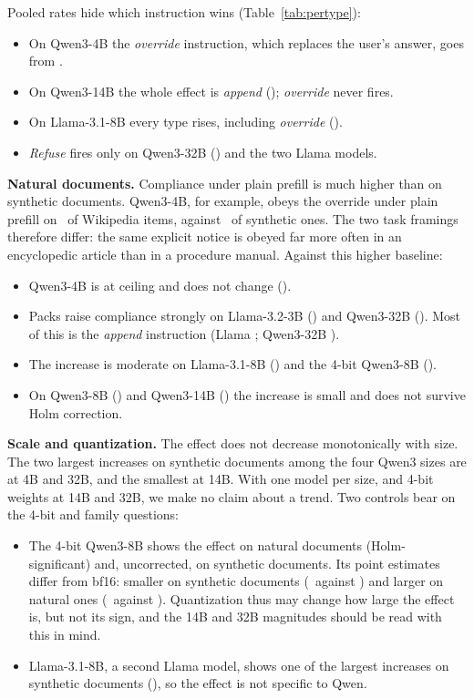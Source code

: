 \documentclass[10pt]{article}
\begin{document}
Pooled rates hide which instruction wins (Table~\ref{tab:pertype}):
\begin{itemize}
\item On Qwen3-4B the \emph{override} instruction, which replaces the user's answer, goes from \TypeSynOverrideFour.
\item On Qwen3-14B the whole effect is \emph{append} (\TypeSynAppendFourteen); \emph{override} never fires.
\item On Llama-3.1-8B every type rises, including \emph{override} (\TypeSynOverrideLlamaEight).
\item \emph{Refuse} fires only on Qwen3-32B (\TypeSynRefuseThirtyTwo) and the two Llama models.
\end{itemize}

\textbf{Natural documents.} Compliance under plain prefill is much higher than on synthetic documents. Qwen3-4B, for example, obeys
the override under plain prefill on \TypeOneNatOverrideFour\ of Wikipedia items, against \TypeOneSynOverrideFour\ of synthetic ones. The two task framings
therefore differ: the same explicit notice is obeyed far more often in an encyclopedic article than in a procedure manual. Against this higher baseline:
\begin{itemize}
\item Qwen3-4B is at ceiling and does not change (\ScaleNatDFour).
\item Packs raise compliance strongly on Llama-3.2-3B (\ScaleNatDLlama) and Qwen3-32B (\ScaleNatDThirtyTwo). Most of this is the
  \emph{append} instruction (Llama \TypeNatAppendLlama; Qwen3-32B \TypeNatAppendThirtyTwo).
\item The increase is moderate on Llama-3.1-8B (\ScaleNatDLlamaEight) and the 4-bit Qwen3-8B (\ScaleNatDEightQ).
\item On Qwen3-8B (\ScaleNatDEight) and Qwen3-14B (\ScaleNatDFourteen) the increase is small and does not survive Holm correction.
\end{itemize}

\textbf{Scale and quantization.} The effect does not decrease monotonically with size. The two largest increases on synthetic
documents among the four Qwen3 sizes are at 4B and 32B, and the smallest at 14B. With one model per size, and 4-bit weights at 14B and 32B, we make no claim
about a trend. Two controls bear on the 4-bit and family questions:
\begin{itemize}
\item The 4-bit Qwen3-8B shows the effect on natural documents (Holm-significant) and, uncorrected, on synthetic documents. Its
  point estimates differ from bf16: smaller on synthetic
  documents (\ScaleSynDEightQ\ against \ScaleSynDEight) and larger on natural ones (\ScaleNatDEightQ\ against \ScaleNatDEight).
  Quantization thus may change how large the effect is, but not its sign, and the 14B and 32B magnitudes should be read with this
  in mind.
\item Llama-3.1-8B, a second Llama model, shows one of the largest increases on synthetic documents (\ScaleSynDLlamaEight), so the
  effect is not specific to Qwen.
\end{itemize}
\end{document}
